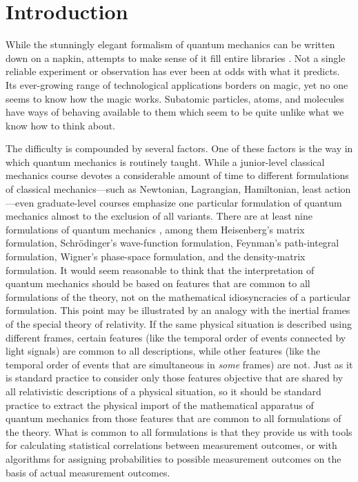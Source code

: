 \section{Introduction}\label{sec:intro}
While the stunningly elegant formalism of quantum mechanics can be written down on a napkin, attempts to make sense of it fill entire libraries \citep[p.~19]{Schlosshauer2011}. Not a single reliable experiment or observation has ever been at odds with what it predicts. Its ever-growing range of technological applications borders on magic, yet no one seems to know how the magic works. Subatomic particles, atoms, and molecules have ways of behaving available to them which seem to be quite unlike what we know how to think about.

The difficulty is compounded by several factors. One of these factors is the way in which quantum mechanics is routinely taught. While a junior-level classical mechanics course devotes a considerable amount of time to different formulations of classical mechanics---such as Newtonian, Lagrangian, Hamiltonian, least action---even graduate-level courses emphasize one particular formulation of quantum mechanics almost to the exclusion of all variants. There are at least nine formulations of quantum mechanics \citep{Styeretal}, among them Heisenberg's matrix formulation, Schr\"odinger's wave-function formulation, Feynman's path-integral formulation, Wigner's phase-space formulation, and the density-matrix formulation. It would seem reasonable to think that the interpretation of quantum mechanics should be based on features that are common to all formulations of the theory, not on the mathematical idiosyncracies of a particular formulation. This point may be illustrated by an analogy with the inertial frames of the special theory of relativity. If the same physical situation is described using different frames, certain features (like the temporal order of events connected by light signals) are common to all descriptions, while other features (like the temporal order of events that are simultaneous in \emph{some} frames) are not. Just as it is standard practice to consider only those features objective that are shared by all relativistic descriptions of a physical situation, so it should be standard practice to extract the physical import of the mathematical apparatus of quantum mechanics from those features that are common to all formulations of the theory. What is common to all formulations is that they provide us with tools for calculating statistical correlations between measurement outcomes, or with algorithms for assigning probabilities to possible measurement outcomes on the basis of actual measurement outcomes.%
